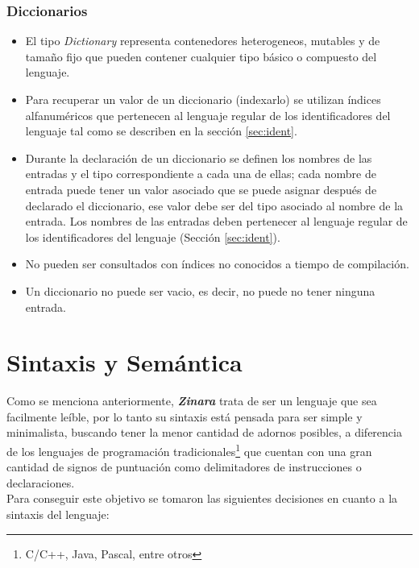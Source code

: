 \documentclass[12pt, spanish]{report}
\begin{document}
\subsubsection{Diccionarios}
\label{sec:dics}
\begin{itemize}
\item El tipo \emph{Dictionary} representa contenedores heterogeneos,
  mutables y de tama\~no fijo que pueden contener cualquier tipo
  b\'asico o compuesto del lenguaje.
\item Para recuperar un valor de un diccionario (indexarlo) se
  utilizan \'indices alfanum\'ericos que pertenecen al lenguaje
  regular de los identificadores del lenguaje tal como se describen en
  la secci\'on \ref{sec:ident}.
\item Durante la declaraci\'on de un diccionario se definen los
  nombres de las entradas y el tipo correspondiente a cada una de
  ellas; cada nombre de entrada puede tener un valor asociado que se
  puede asignar despu\'es de declarado el diccionario, ese valor debe
  ser del tipo asociado al nombre de la entrada. Los nombres de las
  entradas deben pertenecer al lenguaje regular de los identificadores
  del lenguaje (Secci\'on \ref{sec:ident}).
\item No pueden ser consultados con \'indices no conocidos a tiempo de
  compilaci\'on.
\item Un diccionario no puede ser vacio, es decir, no puede no tener
  ninguna entrada.
\end{itemize}

\section{Sintaxis y Sem\'antica}
\label{sec:synsem}

Como se menciona anteriormente, \emph{\textbf{Zinara}} trata de ser un
lenguaje que sea facilmente le\'ible, por lo tanto su sintaxis est\'a
pensada para ser simple y minimalista, buscando tener la menor
cantidad de adornos posibles, a diferencia de los lenguajes de
programaci\'on tradicionales\footnote{C/C++, Java, Pascal, entre
  otros} que cuentan con una gran cantidad de signos de puntuaci\'on
como delimitadores de instrucciones o declaraciones.\\

Para conseguir este objetivo se tomaron las siguientes decisiones en
cuanto a la sintaxis del lenguaje:
\end{document}
